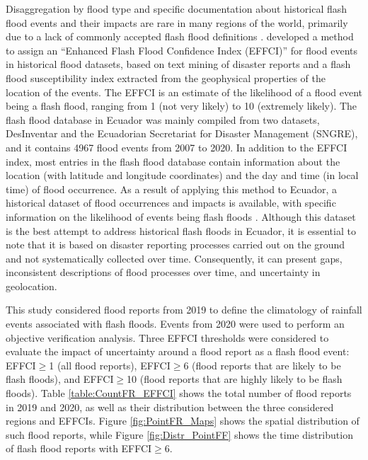 \documentclass[techmemo]{ecmwfrep}%
\begin{document}
Disaggregation by flood type and specific documentation about historical flash flood events and their impacts are rare in many regions of the world, primarily due to a lack of commonly accepted flash flood definitions \citep{Bucherie2022a, Kruczkiewicz2021b}. \cite{Kruczkiewicz2021a} developed a method to assign an “Enhanced Flash Flood Confidence Index (EFFCI)” for flood events in historical flood datasets, based on text mining of disaster reports and a flash flood susceptibility index extracted from the geophysical properties of the location of the events. The EFFCI is an estimate of the likelihood of a flood event being a flash flood, ranging from 1 (not very likely) to 10 (extremely likely). The flash flood database in Ecuador was mainly compiled from two datasets, DesInventar \citep{UNDRR2021} and the Ecuadorian Secretariat for Disaster Management (SNGRE), and it contains 4967 flood events from 2007 to 2020. In addition to the EFFCI index, most entries in the flash flood database contain information about the location (with latitude and longitude coordinates) and the day and time (in local time) of flood occurrence. As a result of applying this method to Ecuador, a historical dataset of flood occurrences and impacts is available, with specific information on the likelihood of events being flash floods \citep{Bucherie2021}. Although this dataset is the best attempt to address historical flash floods in Ecuador, it is essential to note that it is based on disaster reporting processes carried out on the ground and not systematically collected over time. Consequently, it can present gaps, inconsistent descriptions of flood processes over time, and uncertainty in geolocation. 

This study considered flood reports from 2019 to define the climatology of rainfall events associated with flash floods. Events from 2020 were used to perform an objective verification analysis. Three EFFCI thresholds were considered to evaluate the impact of uncertainty around a flood report as a flash flood event: EFFCI$\geq$1 (all flood reports), EFFCI$\geq$6 (flood reports that are likely to be flash floods), and EFFCI$\geq$10 (flood reports that are highly likely to be flash floods). Table \ref{table:CountFR_EFFCI} shows the total number of flood reports in 2019 and 2020, as well as their distribution between the three considered regions and EFFCIs. Figure \ref{fig:PointFR_Maps} shows the spatial distribution of such flood reports, while Figure \ref{fig:Distr_PointFF} shows the time distribution of flash flood reports with EFFCI$\geq$6.
\end{document}
